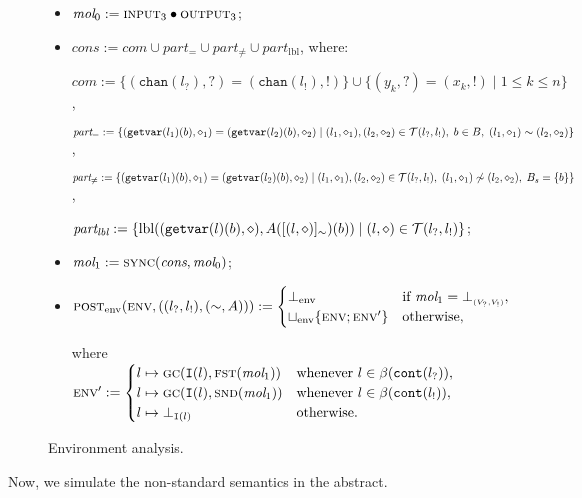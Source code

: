 \documentclass{article}
\newcommand{\bydef}{:=}
\newcommand{\rec}{?}
\newcommand{\eme}{!}
\newcommand{\interface}{\mathtt{I}}
\newcommand{\Extract}{\mathbf{\beta}}
\newcommand{\canal}{\texttt{chan}}
\newcommand{\cont}{\texttt{cont}}
\newcommand{\lrec}{l_{\rec}}
\newcommand{\leme}{l_{\eme}}
\newcommand{\Vrec}{V_{\rec}}
\newcommand{\Veme}{V_{\eme}}
\newcommand{\giveindex}{\texttt{getvar}}
\newcommand{\abst}[1]{\textsc{post}_{#1}}
\newcommand{\envf}{\textsc{env}}
\newcommand{\Moleculeshortkey}{}
\newcommand{\botmolecule}[2]{\bot^{\Moleculeshortkey}_{\scriptscriptstyle ({\scriptscriptstyle #1},{\scriptscriptstyle #2})}}
\newcommand{\Envkey}{\mathrm{env}}
\newcommand{\botenv}{\bot_{\Envkey}}
\newcommand{\cupenv}{\sqcup_{\Envkey}}
\newcommand{\jgc}{\textsc{gc}}
\newcommand{\gc}[2]{\jgc(#1,#2)}
\newcommand{\jsync}{\textsc{sync}}
\newcommand{\sync}[2]{\jsync(#1,#2)}
\newcommand{\concat}{\bullet}
\newcommand{\fst}{\textsc{fst}}
\newcommand{\snd}{\textsc{snd}}
\begin{document}
\begin{figure*}[p]
{\begin{minipage}{0.99\linewidth}
\begin{itemize}
\item $\textit{mol}_0 \bydef \textsc{input}_3\concat \textsc{output}_3$;


\item $\textit{cons} \bydef \textit{com} \cup \textit{part$_=$} \cup \textit{part$_{\not =}$} \cup \textit{part$_\text{lbl}$}$, 
where:


$\textit{com} \bydef
\{(\canal(\lrec),\rec)=(\canal(\leme),\eme)\}
\cup\{(y_k,\rec)=(x_k,\eme)\;|\;1\leq k \leq n\}$,


$\textit{part$_=$} \bydef \{(\giveindex(l_1)(b),\diamond_1)=(\giveindex(l_2)(b),\diamond_2)\;|\;(l_1,\diamond_1),(l_2,\diamond_2)\in \vartrans,\;b\in B,\;(l_1,\diamond_1)\sim (l_2,\diamond_2)\}$,


$\textit{part$_{\not =}$} \bydef \{(\giveindex(l_1)(b),\diamond_1)=(\giveindex(l_2)(b),\diamond_2)\;|\;(l_1,\diamond_1),(l_2,\diamond_2)\in \vartrans,\;(l_1,\diamond_1)\not\sim (l_2,\diamond_2),\;B_s=\{b\}\}$,


$\textit{part$_\text{lbl}$} \bydef \{\textrm{lbl}((\giveindex(l)(b),\diamond),A([(l,\diamond)]_{\sim})(b))\;|\;(l,\diamond)\in \vartrans\}$;
\item  $\textit{mol}_1 \bydef \sync{\textit{cons}}{\textit{mol}_0}$;

\item $\abst{\Envkey}(\envf,((\lrec,\leme),(\sim,A))) \bydef
\begin{cases} 
\botenv & \text{if  } \textit{mol}_1=\botmolecule{\Vrec}{\Veme},\cr
\cupenv \{\envf;\envf'\}&\text{otherwise}, 
\end{cases}$

where $\envf' \bydef \begin{cases}
l \mapsto \gc{\interface(l)}{\fst(\textit{mol}_1)} & \text{whenever } l\in\Extract(\cont(\lrec)),\cr
l \mapsto \gc{\interface(l)}{\snd(\textit{mol}_1)} & \text{whenever } l\in\Extract(\cont(\leme)),\cr
l \mapsto \bot_{\interface(l)} & \text{otherwise}.\end{cases}$
\end{itemize}
\end{minipage}}
\caption{Environment analysis.}
\label{abstractenv}
\end{figure*}


Now, we simulate the non-standard semantics in the abstract.
\end{document}
